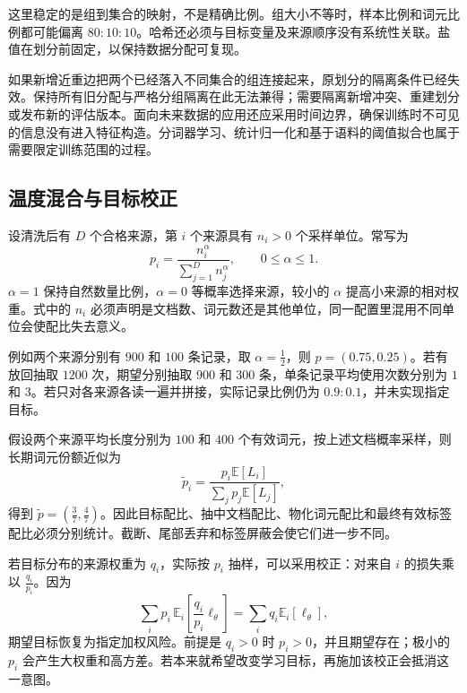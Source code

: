 \documentclass[../textbook.tex]{subfiles}
\begin{document}
这里稳定的是组到集合的映射，不是精确比例。组大小不等时，样本比例和词元比例都可能偏离 $80:10:10$。哈希还必须与目标变量及来源顺序没有系统性关联。盐值在划分前固定，以保持数据分配可复现。

如果新增近重边把两个已经落入不同集合的组连接起来，原划分的隔离条件已经失效。保持所有旧分配与严格分组隔离在此无法兼得；需要隔离新增冲突、重建划分或发布新的评估版本。面向未来数据的应用还应采用时间边界，确保训练时不可见的信息没有进入特征构造。分词器学习、统计归一化和基于语料的阈值拟合也属于需要限定训练范围的过程。

\subsection{温度混合与目标校正}
设清洗后有 $D$ 个合格来源，第 $i$ 个来源具有 $n_i>0$ 个采样单位。常写为
\begin{equation}
p_i=\frac{n_i^\alpha}{\sum_{j=1}^{D}n_j^\alpha},\qquad 0\le\alpha\le1.
\label{eq:data-mixing}
\end{equation}
$\alpha=1$ 保持自然数量比例，$\alpha=0$ 等概率选择来源，较小的 $\alpha$ 提高小来源的相对权重。式中的 $n_i$ 必须声明是文档数、词元数还是其他单位，同一配置里混用不同单位会使配比失去意义。

例如两个来源分别有 $900$ 和 $100$ 条记录，取 $\alpha=\frac{1}{2}$，则 $p=(0.75,0.25)$。若有放回抽取 $1200$ 次，期望分别抽取 $900$ 和 $300$ 条，单条记录平均使用次数分别为 $1$ 和 $3$。若只对各来源各读一遍并拼接，实际记录比例仍为 $0.9:0.1$，并未实现指定目标。

假设两个来源平均长度分别为 $100$ 和 $400$ 个有效词元，按上述文档概率采样，则长期词元份额近似为
\begin{equation}
\widetilde p_i=\frac{p_i\mathbb E[L_i]}{\sum_jp_j\mathbb E[L_j]},
\end{equation}
得到 $\widetilde p=(\frac{3}{7},\frac{4}{7})$。因此目标配比、抽中文档配比、物化词元配比和最终有效标签配比必须分别统计。截断、尾部丢弃和标签屏蔽会使它们进一步不同。

若目标分布的来源权重为 $q_i$，实际按 $p_i$ 抽样，可以采用校正：对来自 $i$ 的损失乘以 $\frac{q_i}{p_i}$。因为
\begin{equation}
\sum_i p_i\,\mathbb E_i\!\left[\frac{q_i}{p_i}\ell_\theta\right]
=\sum_iq_i\mathbb E_i[\ell_\theta],
\end{equation}
期望目标恢复为指定加权风险。前提是 $q_i>0$ 时 $p_i>0$，并且期望存在；极小的 $p_i$ 会产生大权重和高方差。若本来就希望改变学习目标，再施加该校正会抵消这一意图。
\end{document}
